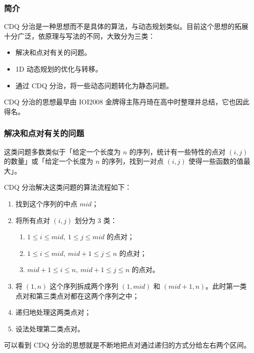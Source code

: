 \subsubsection*{简介}

CDQ 分治是一种思想而不是具体的算法，与动态规划类似。目前这个思想的拓展十分广泛，依原理与写法的不同，大致分为三类：

\begin{itemize}
    \item 解决和点对有关的问题。
    \item 1D 动态规划的优化与转移。
    \item 通过 CDQ 分治，将一些动态问题转化为静态问题。
\end{itemize}

CDQ 分治的思想最早由 IOI2008 金牌得主陈丹琦在高中时整理并总结，它也因此得名。

\hrulefill

\subsubsection*{解决和点对有关的问题}

这类问题多数类似于「给定一个长度为 $n$ 的序列，统计有一些特性的点对 $(i,j)$ 的数量」或「给定一个长度为 $n$ 的序列，找到一对点 $(i,j)$ 使得一些函数的值最大」。

CDQ 分治解决这类问题的算法流程如下：

\begin{enumerate}
    \item 找到这个序列的中点 $mid$；
    \item 将所有点对 $(i,j)$ 划分为 3 类：
    \begin{enumerate}
        \item $1 \le i \le mid,\ 1 \le j \le mid$ 的点对；
        \item $1 \le i \le mid,\ mid+1 \le j \le n$ 的点对；
        \item $mid+1 \le i \le n,\ mid+1 \le j \le n$ 的点对。
    \end{enumerate}
    \item 将 $(1,n)$ 这个序列拆成两个序列 $(1,mid)$ 和 $(mid+1,n)$。此时第一类点对和第三类点对都在这两个序列之中；
    \item 递归地处理这两类点对；
    \item 设法处理第二类点对。
\end{enumerate}

可以看到 CDQ 分治的思想就是不断地把点对通过递归的方式分给左右两个区间。

